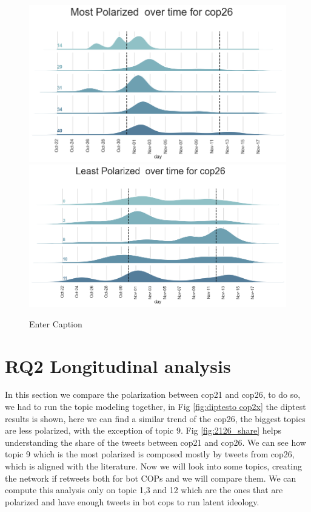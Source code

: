\begin{figure}[H]
    \centering
    \includegraphics[width=0.75\linewidth]{Chapter5/figures/ridge_most_26.png}
     \includegraphics[width=0.75\linewidth]{Chapter5/figures/ridge_least_26.png}
    \caption{Enter Caption}
    \label{fig:ridge_topics}
\end{figure}


\section{RQ2 Longitudinal analysis}

In this section we compare the polarization between cop21 and cop26, to do so, we had to run the topic modeling together, in Fig \ref{fig:diptesto cop2x} the diptest results is shown, here we can find a similar trend of the cop26, the biggest topics are less polarized, with the exception of topic 9. Fig \ref{fig:2126_share} helps understanding the share of the tweets between cop21 and cop26. We can see how topic 9 which is the most polarized is composed mostly by tweets from cop26, which is aligned with the literature. Now we will look into some topics, creating the network if retweets both for bot COPs and we will compare them. We can compute this analysis only on topic 1,3 and 12 which are the ones that are polarized and have enough tweets in bot cops to run latent ideology.  

